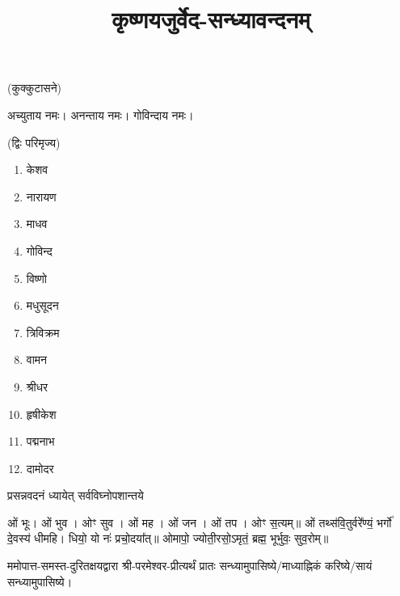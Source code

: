 \setmainfont[Script=Devanagari,Mapping=tex-text,Mapping=devanagarinumerals,AutoFakeBold=2.0]{Siddhanta}
\title{\Huge कृष्णयजुर्वेद-सन्ध्यावन्दनम्}
\date{}
\maketitle

\clearpage


(कुक्कुटासने)

अच्युताय नमः। अनन्ताय नमः। गोविन्दाय नमः। 

(द्विः परिमृज्य)


\begin{multicols}{3}
\begin{enumerate}
    \item केशव
    \item नारायण
    \item माधव
    \item गोविन्द
    \item विष्णो
    \item मधुसूदन
    \item त्रिविक्रम
    \item वामन
    \item श्रीधर
    \item हृषीकेश
    \item पद्मनाभ
    \item दामोदर
\end{enumerate}
\end{multicols}


{प्रसन्नवदनं ध्यायेत् सर्वविघ्नोपशान्तये}


ओं भूः। ओं भुव। ओꣳ सुव। ओं मह। ओं जन। ओं तप। ओꣳ स॒त्यम्॥
ओं तथ्स॑वि॒तुर्वरे᳚ण्यं॒ भर्गो॑ दे॒वस्य॑ धीमहि। धियो॒ यो नः॑ प्रचो॒दया᳚त्॥
ओमापो॒ ज्योती॒रसो॒ऽमृतं॒ ब्रह्म॒ भूर्भुवः॒ सुव॒रोम्॥


ममोपात्त-समस्त-दुरितक्षयद्वारा श्री-परमेश्वर-प्रीत्यर्थं प्रातः सन्ध्यामुपासिष्ये/माध्याह्निकं करिष्ये/सायं सन्ध्यामुपासिष्ये।

